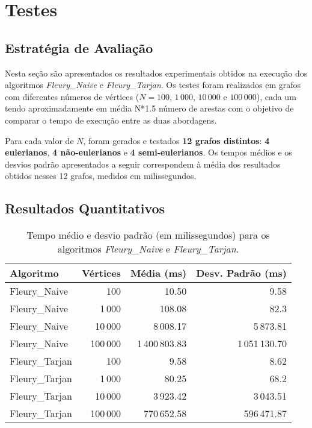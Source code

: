 \documentclass[12pt]{article}
\begin{document}
\section{Testes}

\subsection{Estratégia de Avaliação}
Nesta seção são apresentados os resultados experimentais obtidos na execução dos algoritmos
\textit{Fleury\_Naive} e \textit{Fleury\_Tarjan}.
Os testes foram realizados em grafos com diferentes números de vértices
($N = 100$, $1\,000$, $10\,000$ e $100\,000$), cada um tendo aproximadamente em média N*1.5 número de arestas
com o objetivo de comparar o tempo de execução entre as duas abordagens.

Para cada valor de $N$, foram gerados e testados \textbf{12 grafos distintos}:
\textbf{4 eulerianos}, \textbf{4 não-eulerianos} e \textbf{4 semi-eulerianos}.
Os tempos médios e os desvios padrão apresentados a seguir correspondem à média dos resultados
obtidos nesses 12 grafos, medidos em milissegundos.
\subsection{Resultados Quantitativos}
\begin{table}[h!]
\centering
\caption{Tempo médio e desvio padrão (em milissegundos) para os algoritmos \textit{Fleury\_Naive} e \textit{Fleury\_Tarjan}.}
\label{tab:tempos}
\begin{tabular}{l r r r}
\toprule
\textbf{Algoritmo} & \textbf{Vértices} & \textbf{Média (ms)} & \textbf{Desv. Padrão (ms)} \\
\midrule
Fleury\_Naive  & 100       & 10.50   & 9.58   \\
Fleury\_Naive  & 1\,000    & 108.08  & 82.3   \\
Fleury\_Naive  & 10\,000   & 8\,008.17 & 5\,873.81  \\
Fleury\_Naive  & 100\,000  & 1\,400\,803.83 & 1\,051\,130.70 \\
\midrule
Fleury\_Tarjan & 100       & 9.58    & 8.62   \\
Fleury\_Tarjan & 1\,000    & 80.25   & 68.2   \\
Fleury\_Tarjan & 10\,000   & 3\,923.42  & 3\,043.51\\
Fleury\_Tarjan & 100\,000  & 770\,652.58 & 596\,471.87  \\
\bottomrule
\end{tabular}
\end{table}
\end{document}
